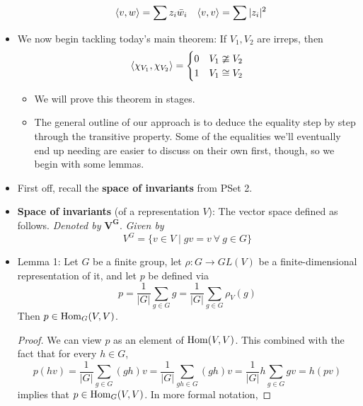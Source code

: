 \documentclass[../notes.tex]{subfiles}
\begin{document}
\begin{itemize}
\begin{itemize}
\begin{align*}
            \left\langle{v,w}\right\rangle &= \sum z_i\bar{w}_i&
            \left\langle{v,v}\right\rangle &= \sum|z_i|^2
        \end{align*}
    \end{itemize}
    \item We now begin tackling today's main theorem: If $V_1,V_2$ are irreps, then
    \begin{equation*}
        \left\langle{\chi_{V_1},\chi_{V_2}}\right\rangle =
        \begin{cases}
            0 & V_1\ncong V_2\\
            1 & V_1\cong V_2
        \end{cases}
    \end{equation*}
    \begin{itemize}
        \item We will prove this theorem in stages.
        \item The general outline of our approach is to deduce the equality step by step through the transitive property. Some of the equalities we'll eventually end up needing are easier to discuss on their own first, though, so we begin with some lemmas.
    \end{itemize}
    \item First off, recall the \textbf{space of invariants} from PSet 2.
    \item \textbf{Space of invariants} (of a representation $V$): The vector space defined as follows. \emph{Denoted by} $\bm{V^G}$. \emph{Given by}
    \begin{equation*}
        V^G = \{v\in V\mid gv=v\ \forall\ g\in G\}
    \end{equation*}
    \item Lemma 1: Let $G$ be a finite group, let $\rho:G\to GL(V)$ be a finite-dimensional representation of it, and let $p$ be defined via
    \begin{equation*}
        p = \frac{1}{|G|}\sum_{g\in G}g = \frac{1}{|G|}\sum_{g\in G}\rho_V(g)
    \end{equation*}
    Then $p\in\operatorname{Hom}_G(V,V)$.
    \begin{proof}
        We can view $p$ as an element of $\operatorname{Hom}(V,V)$. This combined with the fact that for every $h\in G$,
        \begin{equation*}
            p(hv) = \frac{1}{|G|}\sum_{g\in G}(gh)v
            = \frac{1}{|G|}\sum_{gh\in G}(gh)v
            = \frac{1}{|G|}h\sum_{g\in G}gv
            = h(pv)
        \end{equation*}
        implies that $p\in\operatorname{Hom}_G(V,V)$. In more formal notation,

\end{proof}
\end{itemize}
\end{document}
